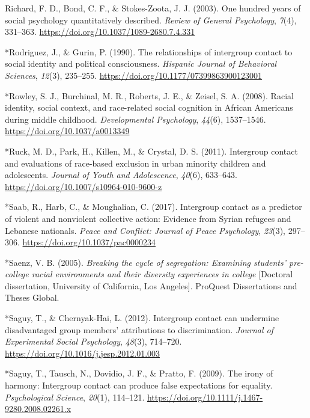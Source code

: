 \documentclass[12pt, letterpaper]{article}
\begin{document}
\leavevmode\hypertarget{ref-richard_one_2003}{}%
Richard, F. D., Bond, C. F., \& Stokes-Zoota, J. J. (2003). One hundred
years of social psychology quantitatively described. \emph{Review of
General Psychology}, \emph{7}(4), 331--363.
\url{https://doi.org/10.1037/1089-2680.7.4.331}

\leavevmode\hypertarget{ref-803}{}%
*Rodriguez, J., \& Gurin, P. (1990). The relationships of intergroup
contact to social identity and political consciousness. \emph{Hispanic
Journal of Behavioral Sciences}, \emph{12}(3), 235--255.
\url{https://doi.org/10.1177/07399863900123001}

\leavevmode\hypertarget{ref-703}{}%
*Rowley, S. J., Burchinal, M. R., Roberts, J. E., \& Zeisel, S. A.
(2008). Racial identity, social context, and race-related social
cognition in African Americans during middle childhood.
\emph{Developmental Psychology}, \emph{44}(6), 1537--1546.
\url{https://doi.org/10.1037/a0013349}

\leavevmode\hypertarget{ref-244}{}%
*Ruck, M. D., Park, H., Killen, M., \& Crystal, D. S. (2011). Intergroup
contact and evaluations of race-based exclusion in urban minority
children and adolescents. \emph{Journal of Youth and Adolescence},
\emph{40}(6), 633--643. \url{https://doi.org/10.1007/s10964-010-9600-z}

\leavevmode\hypertarget{ref-1114}{}%
*Saab, R., Harb, C., \& Moughalian, C. (2017). Intergroup contact as a
predictor of violent and nonviolent collective action: Evidence from
Syrian refugees and Lebanese nationals. \emph{Peace and Conflict:
Journal of Peace Psychology}, \emph{23}(3), 297--306.
\url{https://doi.org/10.1037/pac0000234}

\leavevmode\hypertarget{ref-2333}{}%
*Saenz, V. B. (2005). \emph{Breaking the cycle of segregation: Examining
students' pre-college racial environments and their diversity
experiences in college} {[}Doctoral dissertation, University of
California, Los Angeles{]}. ProQuest Dissertations and Theses Global.

\leavevmode\hypertarget{ref-4005}{}%
*Saguy, T., \& Chernyak-Hai, L. (2012). Intergroup contact can undermine
disadvantaged group members' attributions to discrimination.
\emph{Journal of Experimental Social Psychology}, \emph{48}(3),
714--720. \url{https://doi.org/10.1016/j.jesp.2012.01.003}

\leavevmode\hypertarget{ref-813}{}%
*Saguy, T., Tausch, N., Dovidio, J. F., \& Pratto, F. (2009). The irony
of harmony: Intergroup contact can produce false expectations for
equality. \emph{Psychological Science}, \emph{20}(1), 114--121.
\url{https://doi.org/10.1111/j.1467-9280.2008.02261.x}
\end{document}
